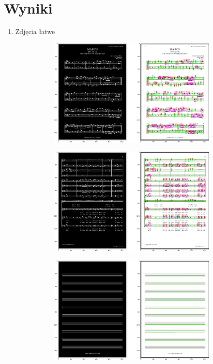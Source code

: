 \documentclass[12pt]{article}
\begin{document}
	\section{Wyniki}
		\begin{enumerate}
			\item{Zdjęcia łatwe}
			\begin{figure}[h!]
				\centering
				\begin{subfigure}[b]{0.48\linewidth}
					\includegraphics[width=\linewidth]{Eazy/Zdj0.png}
				\end{subfigure}
				\begin{subfigure}[b]{0.48\linewidth}
					\includegraphics[width=\linewidth]{Eazy/Zdj1.png}
				\end{subfigure}
				\begin{subfigure}[b]{0.48\linewidth}
					\includegraphics[width=\linewidth]{Eazy/Zdj2.png}

\end{subfigure}
\end{figure}
\end{enumerate}
\end{document}
